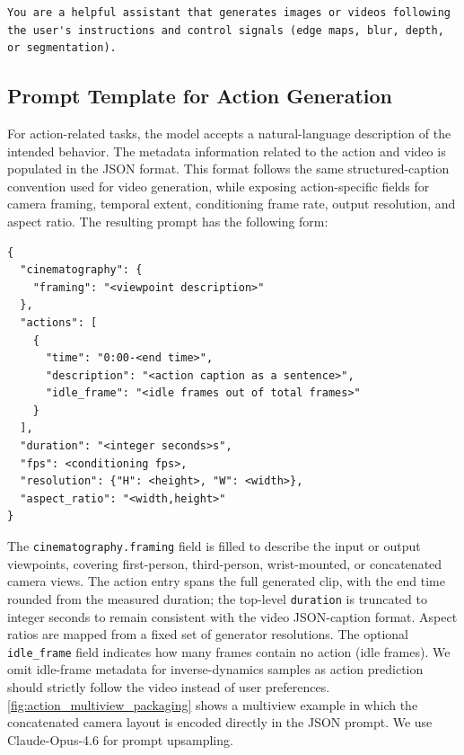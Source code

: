 \begin{tcolorbox}[
    breakable,
    colback=black!2,
    colframe=nvidiagreen!75!white,
    boxrule=0.4pt,
    arc=1pt,
    left=4pt,
    right=4pt,
    top=4pt,
    bottom=4pt,
    title=Cosmos 3 Base Generator Video-to-Video Transfer Prompt Prefix
]
\begin{Verbatim}[breaklines=true,breakanywhere=true,fontsize=\scriptsize]
You are a helpful assistant that generates images or videos following the user's instructions and control signals (edge maps, blur, depth, or segmentation).
\end{Verbatim}
\end{tcolorbox}

\subsection{Prompt Template for Action Generation}
\label{appendix:action_upsampler_prompt}
For action-related tasks, the model accepts a natural-language description of the intended behavior. The metadata information related to the action and video is populated in the JSON format. This format follows the same structured-caption convention used for video generation, while exposing action-specific fields for camera framing, temporal extent, conditioning frame rate, output resolution, and aspect ratio. The resulting prompt has the following form:

\begin{tcolorbox}[
    breakable,
    colback=black!2,
    colframe=nvidiagreen!75!white,
    boxrule=0.4pt,
    arc=1pt,
    left=4pt,
    right=4pt,
    top=4pt,
    bottom=4pt,
    title=Action Generation JSON Prompt Template
]
\begin{Verbatim}[breaklines=true,breakanywhere=true,fontsize=\scriptsize]
{
  "cinematography": {
    "framing": "<viewpoint description>"
  },
  "actions": [
    {
      "time": "0:00-<end time>",
      "description": "<action caption as a sentence>",
      "idle_frame": "<idle frames out of total frames>"
    }
  ],
  "duration": "<integer seconds>s",
  "fps": <conditioning fps>,
  "resolution": {"H": <height>, "W": <width>},
  "aspect_ratio": "<width,height>"
}
\end{Verbatim}
\end{tcolorbox}

The \texttt{cinematography.framing} field is filled to describe the input or output viewpoints, covering first-person, third-person, wrist-mounted, or concatenated camera views.
The action entry spans the full generated clip, with the end time rounded from the measured duration; the top-level \texttt{duration} is truncated to integer seconds to remain consistent with the video JSON-caption format.
Aspect ratios are mapped from a fixed set of generator resolutions.
The optional \texttt{idle\_frame} field indicates how many frames contain no action (idle frames).
We omit idle-frame metadata for inverse-dynamics samples as action prediction should strictly follow the video instead of user preferences.
\cref{fig:action_multiview_packaging} shows a multiview example in which the concatenated camera layout is encoded directly in the JSON prompt. We use Claude-Opus-4.6 for prompt upsampling.

